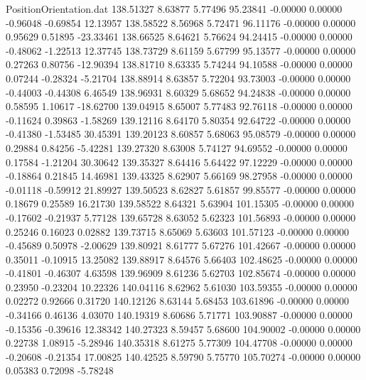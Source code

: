 \begin{filecontents}{PositionOrientation.dat}
 138.51327    8.63877    5.77496    95.23841   -0.00000    0.00000   -0.96048   -0.69854   12.13957
 138.58522    8.56968    5.72471    96.11176   -0.00000    0.00000    0.95629    0.51895  -23.33461
 138.66525    8.64621    5.76624    94.24415   -0.00000    0.00000   -0.48062   -1.22513   12.37745
 138.73729    8.61159    5.67799    95.13577   -0.00000    0.00000    0.27263    0.80756  -12.90394
 138.81710    8.63335    5.74244    94.10588   -0.00000    0.00000    0.07244   -0.28324   -5.21704
 138.88914    8.63857    5.72204    93.73003   -0.00000    0.00000   -0.44003   -0.44308    6.46549
 138.96931    8.60329    5.68652    94.24838   -0.00000    0.00000    0.58595    1.10617  -18.62700
 139.04915    8.65007    5.77483    92.76118   -0.00000    0.00000   -0.11624    0.39863   -1.58269
 139.12116    8.64170    5.80354    92.64722   -0.00000    0.00000   -0.41380   -1.53485   30.45391
 139.20123    8.60857    5.68063    95.08579   -0.00000    0.00000    0.29884    0.84256   -5.42281
 139.27320    8.63008    5.74127    94.69552   -0.00000    0.00000    0.17584   -1.21204   30.30642
 139.35327    8.64416    5.64422    97.12229   -0.00000    0.00000   -0.18864    0.21845   14.46981
 139.43325    8.62907    5.66169    98.27958   -0.00000    0.00000   -0.01118   -0.59912   21.89927
 139.50523    8.62827    5.61857    99.85577   -0.00000    0.00000    0.18679    0.25589   16.21730
 139.58522    8.64321    5.63904   101.15305   -0.00000    0.00000   -0.17602   -0.21937    5.77128
 139.65728    8.63052    5.62323   101.56893   -0.00000    0.00000    0.25246    0.16023    0.02882
 139.73715    8.65069    5.63603   101.57123   -0.00000    0.00000   -0.45689    0.50978   -2.00629
 139.80921    8.61777    5.67276   101.42667   -0.00000    0.00000    0.35011   -0.10915   13.25082
 139.88917    8.64576    5.66403   102.48625   -0.00000    0.00000   -0.41801   -0.46307    4.63598
 139.96909    8.61236    5.62703   102.85674   -0.00000    0.00000    0.23950   -0.23204   10.22326
 140.04116    8.62962    5.61030   103.59355   -0.00000    0.00000    0.02272    0.92666    0.31720
 140.12126    8.63144    5.68453   103.61896   -0.00000    0.00000   -0.34166    0.46136    4.03070
 140.19319    8.60686    5.71771   103.90887   -0.00000    0.00000   -0.15356   -0.39616   12.38342
 140.27323    8.59457    5.68600   104.90002   -0.00000    0.00000    0.22738    1.08915   -5.28946
 140.35318    8.61275    5.77309   104.47708   -0.00000    0.00000   -0.20608   -0.21354   17.00825
 140.42525    8.59790    5.75770   105.70274   -0.00000    0.00000    0.05383    0.72098   -5.78248

\end{filecontents}
